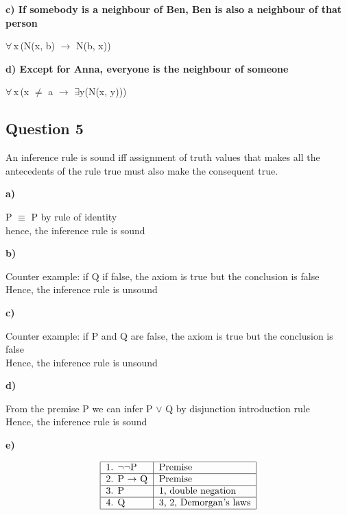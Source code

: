 \documentclass[11pt]{article}
\begin{document}
{\noindent
\textbf{c) If somebody is a neighbour of Ben, Ben is also a neighbour of that person}
\par\parindent 20pt
$\forall$\,x\,(N(x, b) $\rightarrow$ N(b, x))

\noindent
\textbf{d) Except for Anna, everyone is the neighbour of someone}
\par\parindent 20pt
$\forall$\,x\,(x $\neq$ a $\rightarrow$ $\exists$y(N(x, y)))

\subsection*{Question 5}
An inference rule is sound iff assignment of truth values that
makes all the antecedents of the rule true must also make the
consequent true.

\noindent
\textbf{a)} 

P $\equiv$ P by rule of identity\\
\indent
hence, the inference rule is sound
\parskip 6mm

\noindent
\textbf{b)} 

Counter example: if Q if false, the axiom is true but the conclusion is false\\
\indent
Hence, the inference rule is unsound

\noindent
\textbf{c)} 

Counter example: if P and Q are false, the axiom is true but the conclusion is false\\
\indent
Hence, the inference rule is unsound

\noindent
\textbf{d)} 

From the premise P we can infer P $\lor$ Q by disjunction introduction rule\\
\indent
Hence, the inference rule is sound

\noindent
\textbf{e)} 

\setlength{\tabcolsep}{1em} %
{\renewcommand{\arraystretch}{1.5}%
\begin{displaymath}
    \begin{tabular}{| l | l |}
        \hline
        1. $\neg$$\neg$P & Premise \\
        \hline
        2. P $\rightarrow$ Q & Premise \\
        \hline
        3. P & 1, double negation \\
        \hline
        4. Q & 3, 2, Demorgan's laws\\
        \hline
    \end{tabular}
\end{displaymath}

}}
\end{document}
